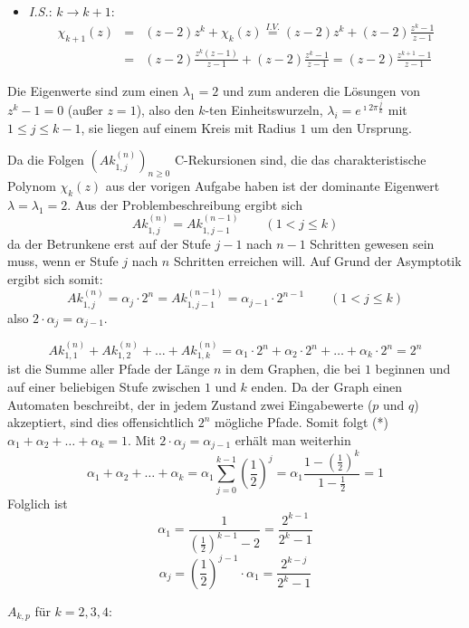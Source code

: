 \begin{flushenum}
\begin{itemize}
		\item \textit{I.S.}: $k \rightarrow k+1$:
			\begin{eqnarray*}
			\chi_{k+1}(z) &=& (z-2) z^{k} + \chi_k(z) \overset{I.V.}{=} (z-2) z^k + (z-2) \frac{z^k - 1}{z-1} \\
			   &=& (z-2) \frac{z^k (z-1)}{z-1} + (z-2)\frac{z^k - 1}{z-1} =
			   (z-2) \frac{z^{k+1} - 1}{z-1}
			\end{eqnarray*}
	\end{itemize}
	Die Eigenwerte sind zum einen $\lambda_1 = 2$ und zum anderen die Lösungen von $z^k - 1 = 0$ (außer $z = 1$), also den
	$k$-ten Einheitswurzeln, $\lambda_i = e^{\imath 2 \pi \frac{j}{k}}$ mit $1 \leq j \leq k-1$, sie liegen
	auf einem Kreis mit Radius $1$ um den Ursprung.

\item 
Da die Folgen $\left( Ak_{1,j}^{(n)} \right)_{n \geq 0}$ C-Rekursionen sind, die das charakteristische Polynom $\chi_k(z)$
aus der vorigen Aufgabe haben ist der dominante Eigenwert $\lambda = \lambda_1 = 2$.
Aus der Problembeschreibung ergibt sich 
\[ Ak_{1,j}^{(n)} = Ak_{1,j-1}^{(n-1)} \quad \quad (1 < j \leq k) \]
da der Betrunkene erst auf der Stufe $j-1$ nach $n-1$ Schritten gewesen sein muss, wenn er Stufe $j$ nach $n$ Schritten erreichen will.
Auf Grund der Asymptotik ergibt sich somit:
\[ Ak_{1,j}^{(n)} = \alpha_j \cdot 2^n = Ak_{1,j-1}^{(n-1)} = \alpha_{j-1} \cdot 2^{n-1} \quad \quad (1 < j \leq k) \]
also $2 \cdot \alpha_j = \alpha_{j-1}$.

\[ Ak_{1,1}^{(n)} + Ak_{1,2}^{(n)} + \ldots + Ak_{1,k}^{(n)} = \alpha_1 \cdot 2^n + \alpha_2 \cdot 2^n + \ldots + \alpha_k \cdot 2^n = 2^n \]
ist die Summe aller Pfade der Länge $n$ in dem Graphen, die bei $1$ beginnen und auf einer beliebigen Stufe zwischen $1$ und $k$ enden.
Da der Graph einen Automaten beschreibt, der in jedem Zustand zwei Eingabewerte ($p$ und $q$) akzeptiert, sind dies offensichtlich
$2^n$ mögliche Pfade.
Somit folgt (*) $\alpha_1 + \alpha_2 + \ldots + \alpha_k = 1$.
Mit $2 \cdot \alpha_j = \alpha_{j-1} $ erhält man weiterhin 
\[ \alpha_1 + \alpha_2 + \ldots + \alpha_k = \alpha_1 \sum_{j=0}^{k-1} \left( \frac{1}{2}\right)^j 
   = \alpha_1  \frac{1 - \left(\frac{1}{2}\right)^k}{1 - \frac{1}{2}}  = 1 \]
Folglich ist 
\[ \alpha_1 = \frac{1}{\left(\frac{1}{2}\right)^{k-1} - 2} = \frac{2^{k-1}}{2^k - 1} \]
\[ \alpha_j = \left(\frac{1}{2}\right)^{j-1} \cdot \alpha_1 = \frac{2^{k-j}}{2^k - 1}\]

\item
  $A_{k,p}$ für $k = 2, 3, 4$:


\end{flushenum}

